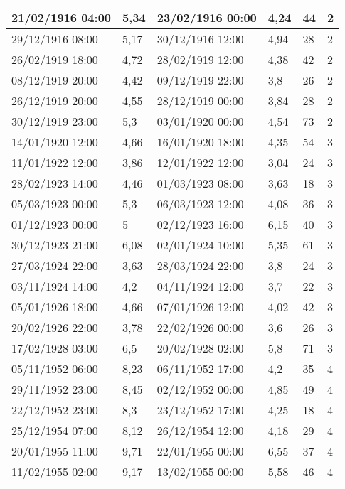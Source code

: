 \documentclass[11pt]{article}
\begin{document}
\begin{longtable}{|l|p{2.3cm}|l|p{2.3cm}|l|l|}
        21/02/1916 04:00 & 5,34 & 23/02/1916 00:00 & 4,24 & 44 & 2 \\ \hline
        29/12/1916 08:00 & 5,17 & 30/12/1916 12:00 & 4,94 & 28 & 2 \\ \hline
        26/02/1919 18:00 & 4,72 & 28/02/1919 12:00 & 4,38 & 42 & 2 \\ \hline
        08/12/1919 20:00 & 4,42 & 09/12/1919 22:00 & 3,8 & 26 & 2 \\ \hline
        26/12/1919 20:00 & 4,55 & 28/12/1919 00:00 & 3,84 & 28 & 2 \\ \hline
        30/12/1919 23:00 & 5,3 & 03/01/1920 00:00 & 4,54 & 73 & 2 \\ \hline
        14/01/1920 12:00 & 4,66 & 16/01/1920 18:00 & 4,35 & 54 & 3 \\ \hline
        11/01/1922 12:00 & 3,86 & 12/01/1922 12:00 & 3,04 & 24 & 3 \\ \hline
        28/02/1923 14:00 & 4,46 & 01/03/1923 08:00 & 3,63 & 18 & 3 \\ \hline
        05/03/1923 00:00 & 5,3 & 06/03/1923 12:00 & 4,08 & 36 & 3 \\ \hline
        01/12/1923 00:00 & 5 & 02/12/1923 16:00 & 6,15 & 40 & 3 \\ \hline
        30/12/1923 21:00 & 6,08 & 02/01/1924 10:00 & 5,35 & 61 & 3 \\ \hline
        27/03/1924 22:00 & 3,63 & 28/03/1924 22:00 & 3,8 & 24 & 3 \\ \hline
        03/11/1924 14:00 & 4,2 & 04/11/1924 12:00 & 3,7 & 22 & 3 \\ \hline
        05/01/1926 18:00 & 4,66 & 07/01/1926 12:00 & 4,02 & 42 & 3 \\ \hline
        20/02/1926 22:00 & 3,78 & 22/02/1926 00:00 & 3,6 & 26 & 3 \\ \hline
        17/02/1928 03:00 & 6,5 & 20/02/1928 02:00 & 5,8 & 71 & 3 \\ \hline
        05/11/1952 06:00 & 8,23 & 06/11/1952 17:00 & 4,2 & 35 & 4 \\ \hline
        29/11/1952 23:00 & 8,45 & 02/12/1952 00:00 & 4,85 & 49 & 4 \\ \hline
        22/12/1952 23:00 & 8,3 & 23/12/1952 17:00 & 4,25 & 18 & 4 \\ \hline
        25/12/1954 07:00 & 8,12 & 26/12/1954 12:00 & 4,18 & 29 & 4 \\ \hline
        20/01/1955 11:00 & 9,71 & 22/01/1955 00:00 & 6,55 & 37 & 4 \\ \hline
        11/02/1955 02:00 & 9,17 & 13/02/1955 00:00 & 5,58 & 46 & 4 \\ \hline

\end{longtable}
\end{document}
